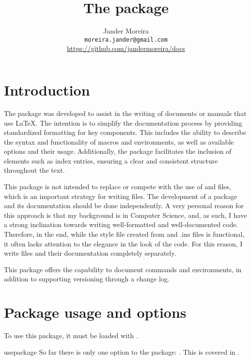 \documentclass[11pt, outdir = ./out]{article}
\title{The \PackageName{docs} package\\\normalsize\textsf{\DocsVersion}}
\author{%
    Jander Moreira\\%
    \texttt{moreira.jander@gmail.com}\\%
    \url{https://github.com/jandermoreira/docs}%
}
\date{\DocsDate}
\begin{document}
\maketitle
\tableofcontents

\DocsPrintChanges


\section{Introduction}

The  package was developed to assist in the writing of documents or manuals that use \LaTeX. The intention is to simplify the documentation process by providing standardized formatting for key components. This includes the ability to describe the syntax and functionality of macros and environments, as well as available options and their usage. Additionally, the package facilitates the inclusion of elements such as index entries, ensuring a clear and consistent structure throughout the text.

This package is not intended to replace or compete with the use of  and  files, which is an important strategy for writing  files. The development of a package and its documentation should be done independently. A very personal reason for this approach is that my background is in Computer Science, and, as such, I have a strong inclination towards writing well-formatted and well-documented code. Therefore, in the end, while the style file created from  and .ins files is functional, it often lacks attention to the elegance in the look of the code. For this reason, I write  files and their documentation completely separately.

This package offers the capability to document commands and environments, in addition to supporting versioning through a change log.

\section{Package usage and options}
To use this package, it must be loaded with .

\begin{Macro*}{usepackage}{}{}
    So far there is only one option to the package: . This is covered in .
\end{Macro*}
\end{document}
